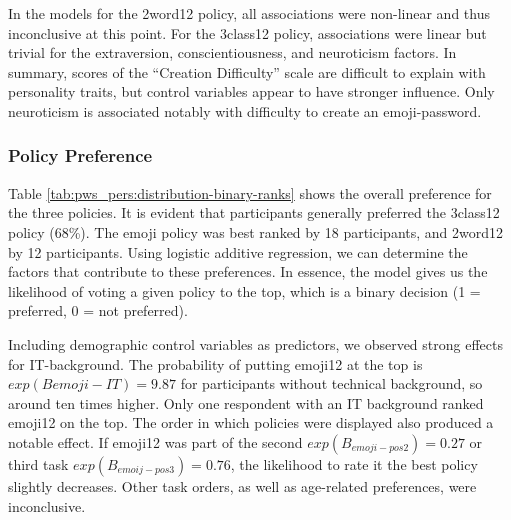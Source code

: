 In the models for the 2word12 policy, all associations were non-linear and thus inconclusive at this point. For the 3class12 policy, associations were linear but trivial for the extraversion, conscientiousness, and neuroticism factors. In summary, scores of the ``Creation Difficulty'' scale are difficult to explain with personality traits, but control variables appear to have stronger influence. Only neuroticism is associated notably with difficulty to create an emoji-password.

\subsubsection{Policy Preference}
Table \ref{tab:pws_pers:distribution-binary-ranks} shows the overall preference for the three policies. It is evident that participants generally preferred the 3class12 policy (68\%). The emoji policy was best ranked by 18 participants, and 2word12 by 12 participants. Using logistic additive regression, we can determine the factors that contribute to these preferences. %
In essence, the model gives us the likelihood of voting a given policy to the top, which is a binary decision (1 = preferred, 0 = not preferred). 

Including demographic control variables as predictors, we observed strong effects for IT-background. The probability of putting emoji12 at the top is $exp(B{emoji-IT}) = 9.87$ for participants without technical background, so around ten times higher. Only one respondent with an IT background ranked emoji12 on the top. %
The order in which policies were displayed also produced a notable effect. If emoji12 was part of the second $exp(B_{emoji-pos2}) = 0.27$ or third task $exp(B_{emoij-pos3}) = 0.76$, the likelihood to rate it the best policy slightly decreases. Other task orders, as well as age-related preferences, were inconclusive.

